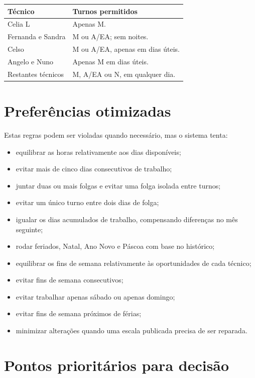 \documentclass[10pt,a4paper]{article}
\begin{document}
\begin{center}
\begin{tabular}{>{\raggedright\arraybackslash}p{}
                >{\raggedright\arraybackslash}p{}}
\toprule
\textbf{Técnico} & \textbf{Turnos permitidos} \\
\midrule
Celia L & Apenas M. \\
Fernanda e Sandra & M ou A/EA; sem noites. \\
Celso & M ou A/EA, apenas em dias úteis. \\
Angelo e Nuno & Apenas M em dias úteis. \\
Restantes técnicos & M, A/EA ou N, em qualquer dia. \\
\bottomrule
\end{tabular}
\end{center}

\section*{Preferências otimizadas}

Estas regras podem ser violadas quando necessário, mas o sistema tenta:

\begin{itemize}
    \item equilibrar as horas relativamente aos dias disponíveis;
    \item evitar mais de cinco dias consecutivos de trabalho;
    \item juntar duas ou mais folgas e evitar uma folga isolada entre turnos;
    \item evitar um único turno entre dois dias de folga;
    \item igualar os dias acumulados de trabalho, compensando diferenças no mês seguinte;
    \item rodar feriados, Natal, Ano Novo e Páscoa com base no histórico;
    \item equilibrar os fins de semana relativamente às oportunidades de cada técnico;
    \item evitar fins de semana consecutivos;
    \item evitar trabalhar apenas sábado ou apenas domingo;
    \item evitar fins de semana próximos de férias;
    \item minimizar alterações quando uma escala publicada precisa de ser reparada.
\end{itemize}

\section*{Pontos prioritários para decisão}
\end{document}

